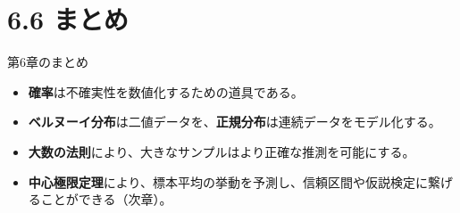 \documentclass[
  ignorenonframetext,
]{beamer}
\providecommand{\tightlist}{%
  \setlength{\itemsep}{0pt}\setlength{\parskip}{0pt}}
\begin{document}
\hypertarget{ux307eux3068ux3081}{%
\section{6.6 まとめ}\label{ux307eux3068ux3081}}

\begin{frame}{第6章のまとめ}
\protect\hypertarget{ux7b2c6ux7ae0ux306eux307eux3068ux3081}{}
\begin{itemize}
\tightlist
\item
  \textbf{確率}は不確実性を数値化するための道具である。
\item
  \textbf{ベルヌーイ分布}は二値データを、\textbf{正規分布}は連続データをモデル化する。
\item
  \textbf{大数の法則}により、大きなサンプルはより正確な推測を可能にする。
\item
  \textbf{中心極限定理}により、標本平均の挙動を予測し、信頼区間や仮説検定に繋げることができる（次章）。
\end{itemize}
\end{frame}
\end{document}
